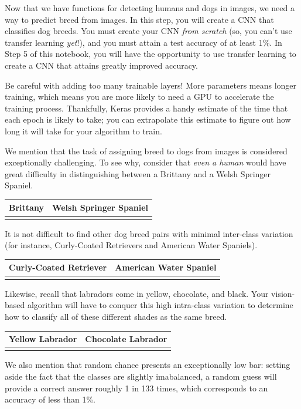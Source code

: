 \documentclass[11pt]{article}
\begin{document}
Now that we have functions for detecting humans and dogs in images, we
need a way to predict breed from images. In this step, you will create a
CNN that classifies dog breeds. You must create your CNN \emph{from
scratch} (so, you can't use transfer learning \emph{yet}!), and you must
attain a test accuracy of at least 1\%. In Step 5 of this notebook, you
will have the opportunity to use transfer learning to create a CNN that
attains greatly improved accuracy.

Be careful with adding too many trainable layers! More parameters means
longer training, which means you are more likely to need a GPU to
accelerate the training process. Thankfully, Keras provides a handy
estimate of the time that each epoch is likely to take; you can
extrapolate this estimate to figure out how long it will take for your
algorithm to train.

We mention that the task of assigning breed to dogs from images is
considered exceptionally challenging. To see why, consider that
\emph{even a human} would have great difficulty in distinguishing
between a Brittany and a Welsh Springer Spaniel.

\begin{longtable}[]{@{}ll@{}}
\toprule
Brittany & Welsh Springer Spaniel\tabularnewline
\midrule
\endhead
&\tabularnewline
\bottomrule
\end{longtable}

It is not difficult to find other dog breed pairs with minimal
inter-class variation (for instance, Curly-Coated Retrievers and
American Water Spaniels).

\begin{longtable}[]{@{}ll@{}}
\toprule
Curly-Coated Retriever & American Water Spaniel\tabularnewline
\midrule
\endhead
&\tabularnewline
\bottomrule
\end{longtable}

Likewise, recall that labradors come in yellow, chocolate, and black.
Your vision-based algorithm will have to conquer this high intra-class
variation to determine how to classify all of these different shades as
the same breed.

\begin{longtable}[]{@{}ll@{}}
\toprule
Yellow Labrador & Chocolate Labrador\tabularnewline
\midrule
\endhead
&\tabularnewline
\bottomrule
\end{longtable}

We also mention that random chance presents an exceptionally low bar:
setting aside the fact that the classes are slightly imabalanced, a
random guess will provide a correct answer roughly 1 in 133 times, which
corresponds to an accuracy of less than 1\%.
\end{document}
